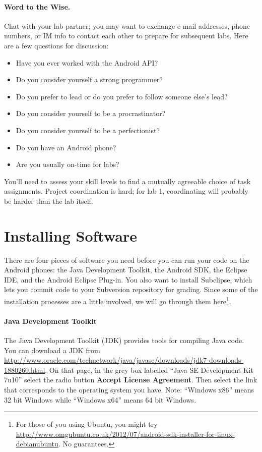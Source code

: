 \documentclass[10pt]{article}
\begin{document}

\paragraph{Word to the Wise.} Chat with your lab partner; you may want to exchange e-mail addresses,
phone numbers, or IM info to contact each other to prepare for
subsequent labs.
Here are a few questions for discussion:
\begin{itemize}
\item Have you ever worked with the Android API?
\item Do you consider yourself a strong programmer?
\item Do you prefer to lead or do you prefer to follow someone else's lead?
\item Do you consider yourself to be a procrastinator?
\item Do you consider yourself to be a perfectionist?
\item Do you have an Android phone? 
\item Are you usually on-time for labs?
\end{itemize}

You'll need to assess your skill levels to
find a mutually agreeable choice of task assignments. 
Project coordination is hard; for lab 1, coordinating
will probably be harder than the lab itself.

\section{Installing Software}

There are four pieces of software you need before you can run your code on the Android phones: the Java Development Toolkit, the Android SDK, the Eclipse IDE, and the Android Eclipse Plug-in. You also want to install Subclipse, which lets you commit code to your Subversion repository for grading. Since some of the installation processes are a little involved, we will go through them here\footnote{For those of you using Ubuntu, you might try \url{http://www.omgubuntu.co.uk/2012/07/android-sdk-installer-for-linux-debianubuntu}. No guarantees.}.

\paragraph{Java Development Toolkit}
The Java Development Toolkit (JDK) provides tools for compiling Java code. You can download a JDK from \url{http://www.oracle.com/technetwork/java/javase/downloads/jdk7-downloads-1880260.html}. On that page, in the grey box labelled ``Java SE Development Kit 7u10'' select the radio button \textbf{Accept License Agreement}. Then select the link that corresponds to the operating system you have. Note: ``Windows x86'' means 32 bit Windows while ``Windows x64'' means 64 bit Windows.
\end{document}
